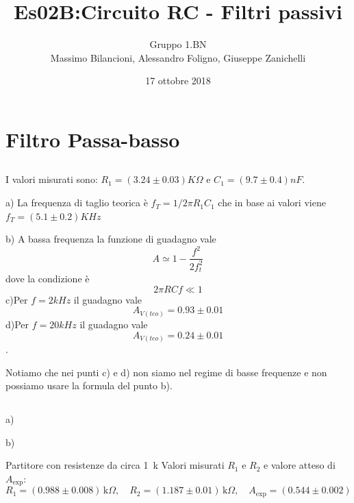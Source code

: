 \documentclass[10pt,a4paper]{article}
\author{Gruppo 1.BN \\ Massimo Bilancioni, Alessandro Foligno, Giuseppe Zanichelli }
\title{Es02B:Circuito RC - Filtri passivi}
\begin{document}
\date{17 ottobre 2018}
\maketitle


\section{Filtro Passa-basso}
\subsection{}

I valori misurati sono: $R_1  = (3.24\pm 0.03 )K\Omega$ e  $C_1  = (9.7\pm 0.4 )nF$.

a) La frequenza di taglio teorica è  $f_T = 1/2\pi R_1 C_1$ che in base ai valori viene $f_T = (5.1\pm 0.2)KHz$\\
\vspace{0.5cm}

b) A bassa frequenza la funzione di guadagno vale \[A\simeq 1-\frac{f^2}{2f_t^2}\] dove la condizione è \[2\pi RCf\ll1\]
c)Per $f= 2kHz$ il guadagno  vale \[A_{V(teo)}=0.93\pm0.01\]
d)Per $f=20kHz$ il guadagno vale \[A_{V(teo)}=0.24\pm0.01\]. 

Notiamo che nei punti c) e d) non siamo nel regime di basse frequenze e non possiamo usare la formula del punto b).
\subsection{}

a)

b)

 Partitore con resistenze da circa 1~k
Valori misurati $R_1$ e $R_2$ e valore atteso di $A_\mathrm{exp}$:
\[
R_1 = (0.988  \pm0.008  ) \,\mathrm{k}\Omega, \quad
R_2 = (1.187 \pm 0.01 ) \,\mathrm{k}\Omega, \quad
A_\mathrm{exp} = ( 0.544 \pm 0.002 ) 
\]




\subsection{}
\end{document}
